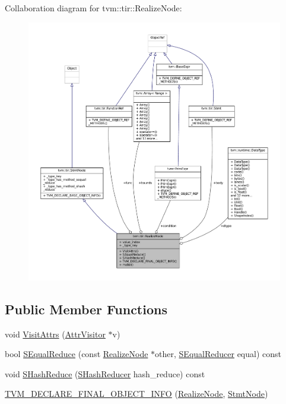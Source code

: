 Collaboration diagram for tvm\+:\+:tir\+:\+:Realize\+Node\+:
\nopagebreak
\begin{figure}[H]
\begin{center}
\leavevmode
\includegraphics[width=350pt]{classtvm_1_1tir_1_1RealizeNode__coll__graph}
\end{center}
\end{figure}
\subsection*{Public Member Functions}
\begin{DoxyCompactItemize}
\item 
void \hyperlink{classtvm_1_1tir_1_1RealizeNode_a81eb59b0034a600c759d231cb23a1d13}{Visit\+Attrs} (\hyperlink{classtvm_1_1AttrVisitor}{Attr\+Visitor} $\ast$v)
\item 
bool \hyperlink{classtvm_1_1tir_1_1RealizeNode_a7b03b82b28f358f5cf41a0a846064cd7}{S\+Equal\+Reduce} (const \hyperlink{classtvm_1_1tir_1_1RealizeNode}{Realize\+Node} $\ast$other, \hyperlink{classtvm_1_1SEqualReducer}{S\+Equal\+Reducer} equal) const 
\item 
void \hyperlink{classtvm_1_1tir_1_1RealizeNode_a579bb23d02358538a7036e2618758bdc}{S\+Hash\+Reduce} (\hyperlink{classtvm_1_1SHashReducer}{S\+Hash\+Reducer} hash\+\_\+reduce) const 
\item 
\hyperlink{classtvm_1_1tir_1_1RealizeNode_ae71417374f0059376826f6ad13d60e1c}{T\+V\+M\+\_\+\+D\+E\+C\+L\+A\+R\+E\+\_\+\+F\+I\+N\+A\+L\+\_\+\+O\+B\+J\+E\+C\+T\+\_\+\+I\+N\+FO} (\hyperlink{classtvm_1_1tir_1_1RealizeNode}{Realize\+Node}, \hyperlink{classtvm_1_1tir_1_1StmtNode}{Stmt\+Node})
\end{DoxyCompactItemize}
